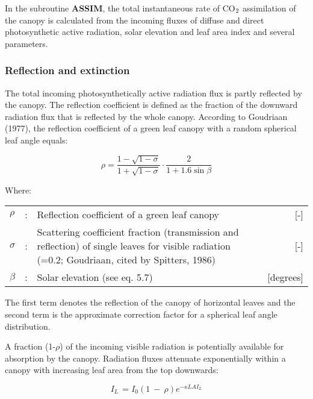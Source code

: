 In the subroutine {\bf ASSIM}, the total instantaneous rate of CO$_{{\rm 2}}$ assimilation of the canopy is
calculated from the incoming fluxes of diffuse and direct photosynthetic active radiation,
solar elevation and leaf area index and several parameters.

\subsubsection{Reflection and extinction}
The total incoming photosynthetically active radiation flux is partly reflected by the
canopy. The reflection coefficient is defined as the fraction of the downward radiation
flux that is reflected by the whole canopy. According to Goudriaan (1977), the reflection
coefficient of a green leaf canopy with a random spherical leaf angle equals:

\begin{equation}
\rho = {\frac{1- \sqrt{1-\sigma}}{1 + \sqrt{1-\sigma}}} \cdot {\frac{2}{1+1.6 \sin \beta }}
\end{equation}

Where:\\[5pt]
\begin{tabularx}{\textwidth}{llXr}
$\rho$ &:& Reflection coefficient of a green leaf canopy    &    [-]\\
$\sigma$ &:& Scattering coefficient fraction (trans\-mission and reflection) 
   of single leaves for visible radiation   
   {\small (=0.2; Goudriaan, cited by Spitters, 1986)}  &     [-]\\  
$\beta$ &:& Solar elevation (see eq. 5.7)    &    [degrees]\\
\end{tabularx}
 
The first term denotes the reflection of the canopy of horizontal leaves and the second
term is the approximate correction factor for a spherical leaf angle distribu\-tion.

A fraction (1-$\rho$) of the incoming visible radiation is potentially available for absorp\-tion by
the canopy. Radiation fluxes attenuate exponentially within a canopy with increasing leaf
area from the top downwards:

\begin{equation}
I_{L~} = I_{0} (1~-~\rho ) e^{-\kappa LAI_{L} }
\end{equation}

